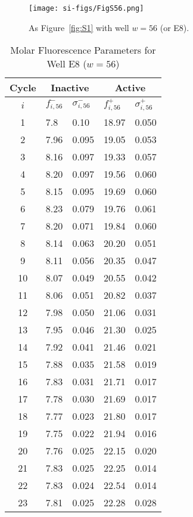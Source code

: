                 \begin{figure}
                    \centering
                    \texttt{[image: si-figs/FigS56.png]}
                    \caption{
                        As Figure~\ref{fig:S1} with well $w=56$ (or E8).
                    }
                \end{figure}
                \clearpage
    \begin{table}
        \caption{Molar Fluorescence Parameters for Well E8 ($w=56$)}
        \centering
        \begin{tabular}{c|ll|ll}
            Cycle & \multicolumn{2}{c|}{Inactive} & \multicolumn{2}{c}{Active} \\
            \hline
            $i$ & $f_{i,56}^{-}$ & $\sigma_{i,56}^{-}$ &  $f_{i,56}^{+}$ & $\sigma_{i,56}^{+}$ \\
            \hline
    1 & 7.8 & 0.10 & 18.97 & 0.050 \\
2 & 7.96 & 0.095 & 19.05 & 0.053 \\
3 & 8.16 & 0.097 & 19.33 & 0.057 \\
4 & 8.20 & 0.097 & 19.56 & 0.060 \\
5 & 8.15 & 0.095 & 19.69 & 0.060 \\
6 & 8.23 & 0.079 & 19.76 & 0.061 \\
7 & 8.20 & 0.071 & 19.84 & 0.060 \\
8 & 8.14 & 0.063 & 20.20 & 0.051 \\
9 & 8.11 & 0.056 & 20.35 & 0.047 \\
10 & 8.07 & 0.049 & 20.55 & 0.042 \\
11 & 8.06 & 0.051 & 20.82 & 0.037 \\
12 & 7.98 & 0.050 & 21.06 & 0.031 \\
13 & 7.95 & 0.046 & 21.30 & 0.025 \\
14 & 7.92 & 0.041 & 21.46 & 0.021 \\
15 & 7.88 & 0.035 & 21.58 & 0.019 \\
16 & 7.83 & 0.031 & 21.71 & 0.017 \\
17 & 7.78 & 0.030 & 21.69 & 0.017 \\
18 & 7.77 & 0.023 & 21.80 & 0.017 \\
19 & 7.75 & 0.022 & 21.94 & 0.016 \\
20 & 7.76 & 0.025 & 22.15 & 0.020 \\
21 & 7.83 & 0.025 & 22.25 & 0.014 \\
22 & 7.83 & 0.024 & 22.54 & 0.014 \\
23 & 7.81 & 0.025 & 22.28 & 0.028 \\

\end{tabular}
\end{table}
